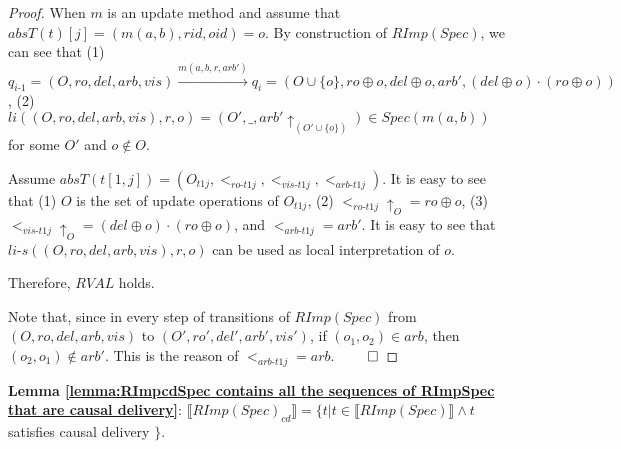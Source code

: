 \begin {proof}
When $m$ is an update method and assume that $absT(t)[j]=(m(a,b),rid,oid)=o$. By construction of $RImp(Spec)$, we can see that (1) $q_{\textit{i-1}} = (O,ro,del,arb,vis) {\xrightarrow{m(a,b,r,arb')}} q_i = (O \cup \{ o \},ro \oplus o ,del \oplus o,arb',(del \oplus o) \cdot (ro \oplus o))$, (2) $li((O,ro,del,arb,vis),r,o) = (O',\_,arb' \uparrow_{(O' \cup \{ o \})}) \in Spec(m(a,b))$ for some $O'$ and $o \notin O$.

Assume $absT(t[1,j]) = (O_\textit{t1j},<_{\textit{ro-t1j}},<_{\textit{vis-t1j}},<_{\textit{arb-t1j}})$. It is easy to see that (1) $O$ is the set of update operations of $O_\textit{t1j}$, (2) $<_{\textit{ro-t1j}} \uparrow_{O} = ro \oplus o$, (3) $<_{\textit{vis-t1j}} \uparrow_{O} = (del \oplus o) \cdot (ro \oplus o)$, and $<_{\textit{arb-t1j}} = arb'$. It is easy to see that $\textit{li-s}((O,ro,del,arb,vis),r,o)$ can be used as local interpretation of $o$.

Therefore, $\textit{RVAL}$ holds.

Note that, since in every step of transitions of $RImp(Spec)$ from $(O,ro,del,arb,vis)$ to $(O',ro',del',arb',vis')$, if $(o_1,o_2) \in arb$, then $(o_2,o_1) \notin arb'$. This is the reason of $<_{\textit{arb-t1j}} = arb$. $\qed$
\end {proof}






{\noindent \bf Lemma \ref{lemma:RImpcdSpec contains all the sequences of RImpSpec that are causal delivery}}: $\llbracket RImp(Spec)_{\textit{cd}} \rrbracket = \{ t \vert t \in \llbracket RImp(Spec) \rrbracket \wedge t$ satisfies causal delivery $\}$.

